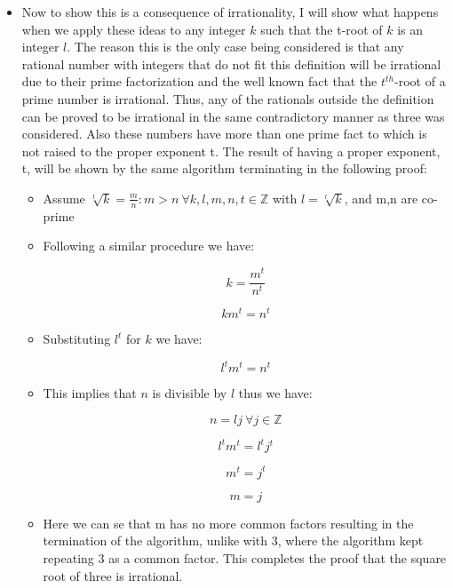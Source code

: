 \documentclass[]{report}
\begin{document}
\begin{itemize}
		\item Now to show this is a consequence of irrationality, I will show what happens when we apply these ideas to any integer $k$ such that the t-root of $k$ is an integer $l$.  The reason this is the only case being considered is that any rational number with integers that do not fit this definition will be irrational due to their prime factorization and the well known fact that the $t^{th}$-root of a prime number is irrational.  Thus, any of the rationals outside the definition can be proved to be irrational in the same contradictory manner as three was considered.  Also these numbers have more than one prime fact to which is not raised to the proper exponent t. The result of having a proper exponent, t, will be shown by the same algorithm terminating in the following proof:
		
		\begin{itemize}
			
			\item Assume $\sqrt[t]{k} = \frac{m}{n} : m > n \ \forall k,l,m,n,t \in \mathbb{Z}$ with $l = \sqrt[t]{k}$, and m,n are co-prime
			
			\item Following a similar procedure we have:
			
			$$ k = \frac{m^t}{n^t} $$
			
			
			$$ km^t = n^t $$
			
			
			\item Substituting $l^t $ for $k$ we have:
			
			$$  l^{t}m^{t} = n^{t} $$
			
			
			\item This implies that $n$ is divisible by $l$ thus we have:
			
			
			$$ n = lj \ \forall j \in \mathbb{Z} $$
			
			$$  l^{t}m^{t} = l^{t}j^{t} $$
			
			$$ m^{t} = j^{t} $$ 
			
			$$ m = j $$
			
			\item Here we can se that m has no more common factors resulting in the termination of the algorithm, unlike with 3, where the algorithm kept repeating 3 as a common factor. This completes the proof that the square root of three is irrational. 
			
		\end{itemize}
		
		
		  
	\end{itemize}
	
\end{document}
